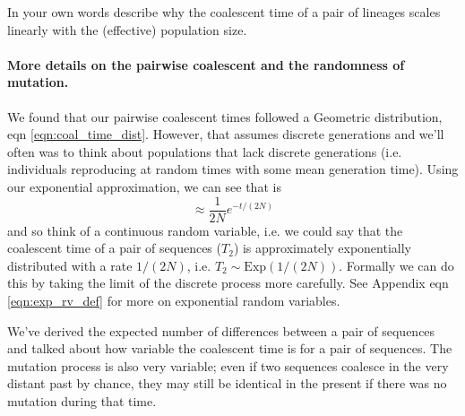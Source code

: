 \begin{question}
In your own words describe why the coalescent time of a pair of lineages scales linearly with the (effective) population size.
\end{question}


\paragraph{More details on the pairwise coalescent and the randomness of mutation.}
We found that our pairwise coalescent times followed a Geometric distribution, eqn  \eqref{eqn:coal_time_dist}. However, that assumes discrete generations and we'll often was to think about populations that lack discrete generations (i.e. individuals reproducing at random times with some mean generation time). Using our exponential approximation, we can see  that is
\begin{equation}
\approx \frac{1}{2N} e^{-t/(2N)}
\end{equation}
and so think of  a continuous random variable, i.e. we could say that the coalescent time of a pair of sequences ($T_2$) is approximately exponentially distributed with a rate $1/(2N)$, i.e. $T_2 \sim \text{Exp}\left( 1/(2N) \right)$. Formally we can do this by taking the limit of the discrete process more carefully. See Appendix eqn \eqref{eqn:exp_rv_def} for more on exponential random variables. 

We've derived the expected number of differences between a pair of sequences and talked about how variable the coalescent time is for a pair of sequences. The mutation process is also very variable; even if two sequences coalesce in the very distant past by chance, they may still be identical in the present if there was no mutation during that time.


